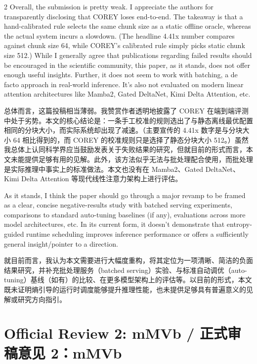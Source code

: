 \documentclass[10pt,a4paper]{article}
\newcommand{\Pair}[2]{#1\par\switchcolumn #2\par\switchcolumn*}
\newcommand{\fieldhead}[1]{{\color{accent}\sffamily\bfseries #1}}
\newcommand{\PairHead}[2]{\Pair{\needspace{5\baselineskip}\fieldhead{#1}}%
                               {\needspace{5\baselineskip}\fieldhead{#2}}}
\begin{document}
\begin{paracol}{2}
\Pair{Overall, the submission is pretty weak. I appreciate the authors for
transparently disclosing that COREY loses end-to-end. The takeaway is that a
hand-calibrated rule selects the same chunk size as a static offline oracle, whereas
the actual system incurs a slowdown. (The headline 4.41x number compares against
chunk size 64, while COREY's calibrated rule simply picks static chunk size 512.)
While I generally agree that publications regarding failed results should be
encouraged in the scientific community, this paper, as it stands, does not offer
enough useful insights. Further, it does not seem to work with batching, a de facto
approach in real-world inference. It's also not evaluated on modern linear attention
architectures like Mamba2, Gated DeltaNet, Kimi Delta Attention, etc.}
{总体而言，这篇投稿相当薄弱。我赞赏作者透明地披露了 COREY 在端到端评测中处于劣势。本文的核心结论是：一条手工校准的规则选出了与静态离线最优配置相同的分块大小，而实际系统却出现了减速。（主要宣传的 4.41x 数字是与分块大小 64 相比得到的，而 COREY 的校准规则只是选择了静态分块大小 512。）虽然我总体上认同科学界应当鼓励发表关于失败结果的研究，但就目前的形式而言，本文未能提供足够有用的见解。此外，该方法似乎无法与批处理配合使用，而批处理是实际推理中事实上的标准做法。本文也没有在 Mamba2、Gated DeltaNet、Kimi Delta Attention 等现代线性注意力架构上进行评估。}

\PairHead{Feedback}{反馈意见}

\Pair{As it stands, I think the paper should go through a major revamp to be framed
as a clear, concise negative-results study with batched serving experiments,
comparisons to standard auto-tuning baselines (if any), evaluations across more
model architectures, etc. In its current form, it doesn't demonstrate that
entropy-guided runtime scheduling improves inference performance or offers a
sufficiently general insight/pointer to a direction.}
{就目前而言，我认为本文需要进行大幅度重构，将其定位为一项清晰、简洁的负面结果研究，并补充批处理服务（batched serving）实验、与标准自动调优（auto-tuning）基线（如有）的比较、在更多模型架构上的评估等。以目前的形式，本文既未证明熵引导的运行时调度能够提升推理性能，也未提供足够具有普遍意义的见解或研究方向指引。}
\end{paracol}

\section{Official Review 2: mMVb / 正式审稿意见 2：mMVb}
\end{document}
